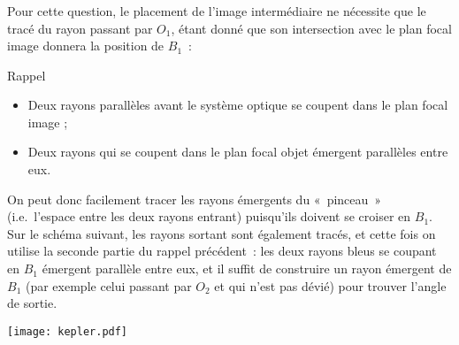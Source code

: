 \documentclass[a4paper, 12pt, final, garamond]{book}
\begin{document}
\subsubsection{}
Pour cette question, le placement de l'image intermédiaire ne nécessite que le
tracé du rayon passant par $O_1$, étant donné que son intersection avec le plan
focal image donnera la position de $B_1$~:

\begin{center}
    \begin{NCdemo}[width=\linewidth]{Rappel}
        \begin{itemize}
            \item Deux rayons parallèles avant le système optique se coupent
                dans le plan focal image ;
            \item Deux rayons qui se coupent dans le plan focal objet émergent
                parallèles entre eux.
        \end{itemize}
    \end{NCdemo}
\end{center}

On peut donc facilement tracer les rayons émergents du «~pinceau~» (i.e.\
l'espace entre les deux rayons entrant) puisqu'ils doivent se croiser en $B_1$.
Sur le schéma suivant, les rayons sortant sont également tracés, et cette fois
on utilise la seconde partie du rappel précédent~: les deux rayons bleus se
coupant en $B_1$ émergent parallèle entre eux, et il suffit de construire un
rayon émergent de $B_1$ (par exemple celui passant par $O_2$ et qui n'est pas
dévié) pour trouver l'angle de sortie.

\begin{center}
    \texttt{[image: kepler.pdf]}
\end{center}
\end{document}
